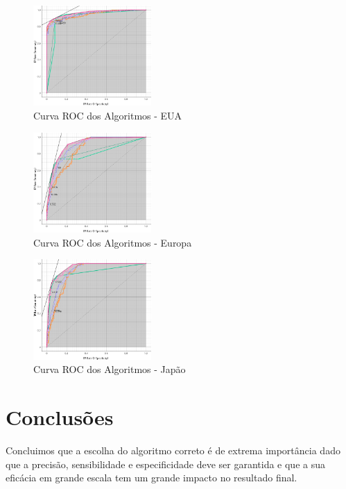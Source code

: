 \documentclass[conference]{IEEEtran}
\begin{document}
\begin{figure}[!ht]
    \centering
    \includegraphics[width=0.4\textwidth]{Resources/ROC_EUA.png}
    \caption{Curva ROC dos Algoritmos - EUA}
\end{figure}

\begin{figure}[!ht]
    \centering
    \includegraphics[width=0.4\textwidth]{Resources/ROC_EU.png}
    \caption{Curva ROC dos Algoritmos - Europa}
\end{figure}

\begin{figure}[!ht]
    \centering
    \includegraphics[width=0.4\textwidth]{Resources/ROC_JP.png}
    \caption{Curva ROC dos Algoritmos - Japão}
\end{figure}


\clearpage
\section{Conclusões}
Concluimos que a escolha do algoritmo correto é de extrema importância dado que a precisão, sensibilidade e especificidade
deve ser garantida e que a sua eficácia em grande escala tem um grande impacto no resultado final.
\end{document}

